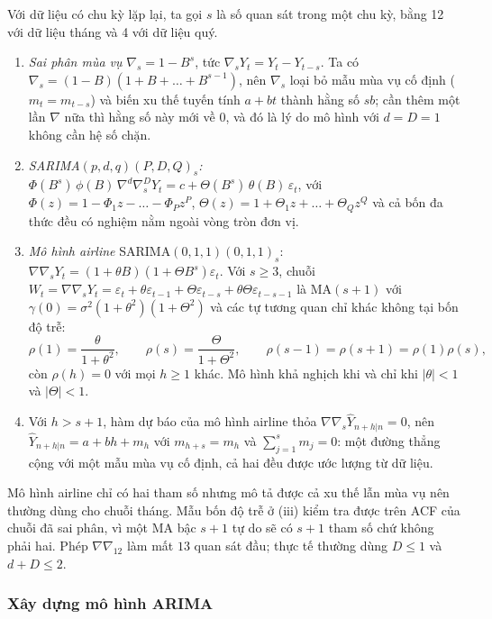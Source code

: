 Với dữ liệu có chu kỳ lặp lại, ta gọi $s$ là số quan sát trong một chu kỳ, bằng 12 với dữ liệu tháng và 4 với dữ liệu quý.
\begin{kq}
\begin{enumerate}[label=(\roman*),leftmargin=*,itemsep=1pt]
\item \emph{Sai phân mùa vụ} $\nabla_s=1-B^s$, tức $\nabla_sY_t=Y_t-Y_{t-s}$. Ta có $\nabla_s=(1-B)(1+B+\dots+B^{s-1})$, nên $\nabla_s$ loại bỏ mẫu mùa vụ cố định ($m_t=m_{t-s}$) và biến xu thế tuyến tính $a+bt$ thành hằng số $sb$; cần thêm một lần $\nabla$ nữa thì hằng số này mới về $0$, và đó là lý do mô hình với $d=D=1$ không cần hệ số chặn.
\item \emph{SARIMA$(p,d,q)(P,D,Q)_s$:} $\Phi(B^s)\,\phi(B)\,\nabla^d\nabla_s^DY_t=c+\Theta(B^s)\,\theta(B)\,\varepsilon_t$, với $\Phi(z)=1-\Phi_1z-\dots-\Phi_Pz^P$, $\Theta(z)=1+\Theta_1z+\dots+\Theta_Qz^Q$ và cả bốn đa thức đều có nghiệm nằm ngoài vòng tròn đơn vị.
\item \emph{Mô hình airline} SARIMA$(0,1,1)(0,1,1)_s$: $\nabla\nabla_sY_t=(1+\theta B)(1+\Theta B^s)\varepsilon_t$. Với $s\ge3$, chuỗi $W_t=\nabla\nabla_sY_t=\varepsilon_t+\theta\varepsilon_{t-1}+\Theta\varepsilon_{t-s}+\theta\Theta\varepsilon_{t-s-1}$ là MA$(s+1)$ với $\gamma(0)=\sigma^2(1+\theta^2)(1+\Theta^2)$ và các tự tương quan chỉ khác không tại bốn độ trễ:
\[
\rho(1)=\frac{\theta}{1+\theta^2},\qquad \rho(s)=\frac{\Theta}{1+\Theta^2},\qquad \rho(s-1)=\rho(s+1)=\rho(1)\rho(s),
\]
còn $\rho(h)=0$ với mọi $h\ge1$ khác. Mô hình khả nghịch khi và chỉ khi $|\theta|<1$ và $|\Theta|<1$.
\item Với $h>s+1$, hàm dự báo của mô hình airline thỏa $\nabla\nabla_s\hat Y_{n+h|n}=0$, nên $\hat Y_{n+h|n}=a+bh+m_h$ với $m_{h+s}=m_h$ và $\sum_{j=1}^{s}m_j=0$: một đường thẳng cộng với một mẫu mùa vụ cố định, cả hai đều được ước lượng từ dữ liệu.
\end{enumerate}
\end{kq}
Mô hình airline chỉ có hai tham số nhưng mô tả được cả xu thế lẫn mùa vụ nên thường dùng cho chuỗi tháng. Mẫu bốn độ trễ ở (iii) kiểm tra được trên ACF của chuỗi đã sai phân, vì một MA bậc $s+1$ tự do sẽ có $s+1$ tham số chứ không phải hai. Phép $\nabla\nabla_{12}$ làm mất $13$ quan sát đầu; thực tế thường dùng $D\le1$ và $d+D\le2$.

\subsubsection{Xây dựng mô hình ARIMA}

